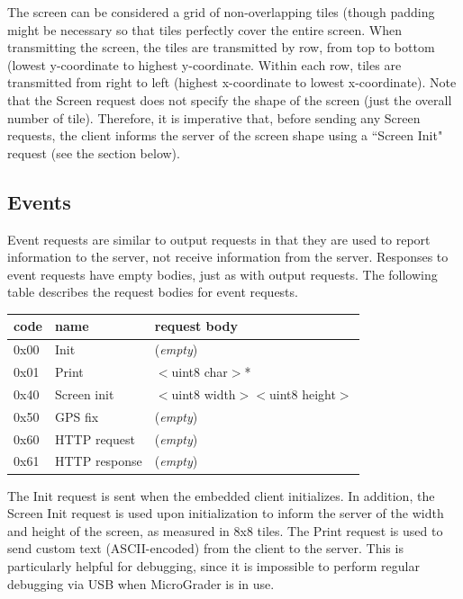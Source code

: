 \documentclass[12pt]{article}
\begin{document}
\begin{appendices}
The screen can be considered a grid of non-overlapping tiles (though padding might be necessary so that tiles perfectly cover the entire screen.  When transmitting the screen, the tiles are transmitted by row, from top to bottom (lowest y-coordinate to highest y-coordinate.  Within each row, tiles are transmitted from right to left (highest x-coordinate to lowest x-coordinate).  Note that the Screen request does not specify the shape of the screen (just the overall number of tile).  Therefore, it is imperative that, before sending any Screen requests, the client informs the server of the screen shape using a ``Screen Init" request (see the section below).

\subsection{Events}
Event requests are similar to output requests in that they are used to report information to the server, not receive information from the server.  Responses to event requests have empty bodies, just as with output requests.  The following table describes the request bodies for event requests.

\begin{center}
\begin{tabular}{l l l}
code & name & request body \\ \hline
0x00 & Init & (\textit{empty}) \\
0x01 & Print & $<$uint8 char$>$* \\
0x40 & Screen init & $<$uint8 width$>$$<$uint8 height$>$ \\
0x50 & GPS fix & (\textit{empty}) \\
0x60 & HTTP request & (\textit{empty}) \\
0x61 & HTTP response & (\textit{empty}) \\ \hline
\end{tabular}
\end{center}

\vspace{5mm}

The Init request is sent when the embedded client initializes.  In addition, the Screen Init request is used upon initialization to inform the server of the width and height of the screen, as measured in 8x8 tiles.  The Print request is used to send custom text (ASCII-encoded) from the client to the server.  This is particularly helpful for debugging, since it is impossible to perform regular debugging via USB when MicroGrader is in use.


\end{appendices}
\end{document}
